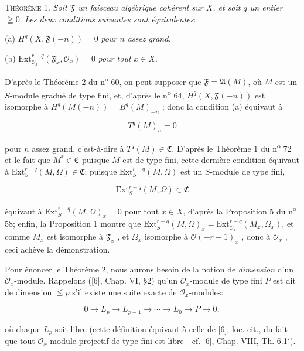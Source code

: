 \textsc{Théorème} 1. \textit{Soit $\mathfrak{F}$ un faisceau algébrique cohérent sur $X$, et soit $q$ un entier} $\geqq 0$. \textit{Les deux conditions suivantes sont équivalentes}:

(a) $H^q(X, \mathfrak{F}(-n)) = 0$ \textit{pour $n$ assez grand.}

(b) $\mathrm{Ext}_{\mathcal{O}_x}^{r-q}(\mathfrak{F}_x , \mathcal{O}_x) = 0$ \textit{pour tout} $x \in X$.

D'après le Théorème 2 du n\textsuperscript{o} 60, on peut supposer que $\mathfrak{F} = \mathfrak{A}(M)$, où $M$ est un $S$-module gradué de type fini, et, d'après le n\textsuperscript{o} 64, $H^q(X, \mathfrak{F}(-n))$ est isomorphe à $H^q(M(-n)) = B^q(M)_{-n}$ ; donc la condition (a) équivaut à

\begin{equation*}
T^q(M)_n = 0
\end{equation*}

pour $n$ assez grand, c'est-à-dire à $T^q(M) \in \mathfrak{C}$. D'après le Théorème 1 du n\textsuperscript{o} 72 et le fait que $M^* \in \mathfrak{C}$ puisque $M$ est de type fini, cette dernière condition équivaut à $\mathrm{Ext}_S^{r-q}(M, \Omega) \in \mathfrak{C}$; puisque $\mathrm{Ext}_S^{r-q}(M, \Omega)$ est un $S$-module de type fini,

\begin{equation*}
\mathrm{Ext}_S^{r-q}(M, \Omega) \in \mathfrak{C}
\end{equation*}

équivaut à $\mathrm{Ext}_S^{r-q}(M, \Omega)_x = 0$ pour tout $x \in X$, d'après la Proposition 5 du n\textsuperscript{o} 58; enfin, la Proposition 1 montre que $\mathrm{Ext}_S^{r-q}(M, \Omega)_x = \mathrm{Ext}_{\mathcal{O}_x}^{r-q}(M_x , \Omega_x)$, et comme $M_x$ est isomorphe à $\mathfrak{F}_x$ , et $\Omega_x$ isomorphe à $\mathcal{O}(-r - 1)_x$ , donc à $\mathcal{O}_x$ , ceci achève la démonstration.

Pour énoncer le Théorème 2, nous aurons besoin de la notion de \textit{dimension} d'un $\mathcal{O}_x$-module. Rappelons ([6], Chap. VI, \S2) qu'un $\mathcal{O}_x$-module de type fini $P$ est dit de dimension $\leqq p$ s'il existe une suite exacte de $\mathcal{O}_x$-modules:

\begin{equation*}
0 \rightarrow L_p \rightarrow L_{p-1} \rightarrow \cdots \rightarrow L_0 \rightarrow P \rightarrow 0,
\end{equation*}

où chaque $L_p$ soit libre (cette définition équivaut à celle de [6], loc. cit., du fait que tout $\mathcal{O}_x$-module projectif de type fini est libre---cf. [6], Chap. VIII, Th. 6.1$'$).
